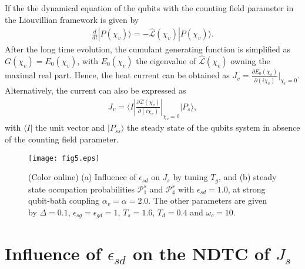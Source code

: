 \documentclass[twocolumn,preprintnumbers,amsmath,amssymb]{revtex4}
\begin{document}
If the the dynamical equation of the qubits with the counting field parameter in the Liouvillian framework is given by
\begin{eqnarray}
\frac{d}{dt}|P(\chi_v){\rangle}=-\mathcal{\hat{L}}(\chi_v)|P(\chi_v){\rangle}.
\end{eqnarray}
After the long time evolution, the cumulant generating function is simplified as
$G(\chi_v)=E_0(\chi_v)$, with $E_0(\chi_v)$ the eigenvalue of $\mathcal{\hat{L}}(\chi_v)$ owning the maximal real part.
Hence, the heat current can be obtained as $J_v=\frac{{\partial}E_0(\chi_v)}{{\partial}(i\chi_v)}|_{\chi_v=0}$.
Alternatively, the current can also be expressed as
\begin{eqnarray}
J_v={\langle}I|\frac{{\partial}\mathcal{\hat{L}}(\chi_v)}{{\partial}(i\chi_v)}|_{\chi_v=0}|P_{s}{\rangle},
\end{eqnarray}
with ${\langle}I|$ the unit vector and $|P_{ss}{\rangle}$ the steady state of the qubits system in absence of the counting field parameter.



\begin{figure}[tbp]
\texttt{[image: fig5.eps]}
\caption{(Color online) (a) Influence of $\epsilon_{sd}$ on $J_s$ by tuning $T_g$,
and (b) steady state occupation probabilities $\mathcal{P}^s_1$ and $\mathcal{P}^s_4$
with $\epsilon_{sd}=1.0$, at strong qubit-bath coupling $\alpha_v=\alpha=2.0$.
The other parameters are given by $\Delta=0.1$, $\epsilon_{sg}=\epsilon_{gd}=1$, $T_s=1.6$, $T_d=0.4$ and $\omega_c=10$.}
\label{fig5}
\end{figure}


\section{Influence of $\epsilon_{sd}$ on the NDTC of $J_s$}
\end{document}
